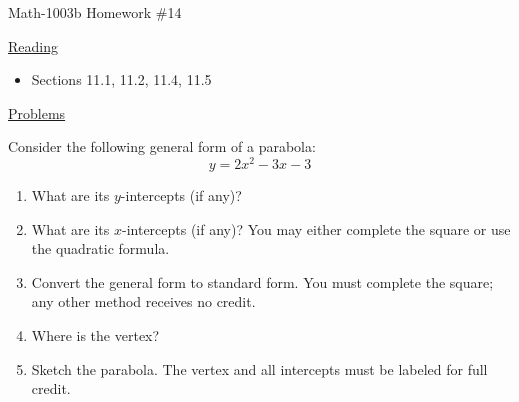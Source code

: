 \documentclass[letterpaper,12pt,fleqn]{article}
\begin{document}
\begin{center}
\Large Math-1003b Homework \#14
\end{center}

\vspace{0.5in}

\underline{Reading}

\bigskip

\begin{itemize}
\item Sections 11.1, 11.2, 11.4, 11.5
\end{itemize}

\bigskip

\underline{Problems}

\bigskip

Consider the following general form of a parabola:
\[y=2x^2-3x-3\]

\begin{enumerate}
\item What are its $y$-intercepts (if any)?

\item What are its $x$-intercepts (if any)? You may either complete the square or use
  the quadratic formula.

\item Convert the general form to standard form. You must complete the square; any other
  method receives no credit.

\item Where is the vertex?

\item Sketch the parabola. The vertex and all intercepts must be labeled for full
  credit.
\end{enumerate}
\end{document}
